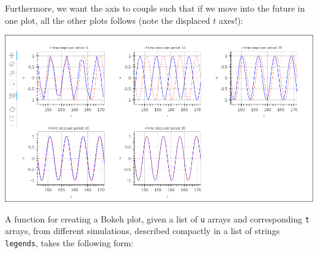 \documentclass[%
oneside,                 %
final,                   %
10pt]{article}
\begin{document}
Furthermore, we want the axis to couple such that if we move into
the future in one plot, all the other plots follows (note the
displaced $t$ axes!):



\centerline{\includegraphics[width=1.0\linewidth]{fig-vib/bokeh_gridplot2.png}}




A function for creating a Bokeh plot, given a list of \texttt{u} arrays
and corresponding \texttt{t} arrays, from different simulations, described
compactly in a list of strings \texttt{legends}, takes the following form:
\end{document}
